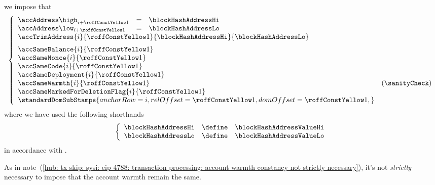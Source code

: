 \item[\underline{\underline{Loading the \inst{BLOCKHASH} system smart contract:}}] 
	we impose that
	\[
		\left\{ \begin{array}{lclr}
			\accAddress  \high _{i + \roffTxSkipSysiBlockHashSystemContractAccount} & = & \blockHashAddressHi \\
			\accAddress  \low  _{i + \roffTxSkipSysiBlockHashSystemContractAccount} & = & \blockHashAddressLo \\
			\multicolumn{4}{l}{
				\accTrimAddress
				{i}{\roffTxSkipSysiBlockHashSystemContractAccount}
				{\blockHashAddressHi}
				{\blockHashAddressLo}} \vspace{2mm} \\
			\multicolumn{3}{l}{\accSameBalance                       {i}{\roffTxSkipSysiBlockHashSystemContractAccount}} \\
			\multicolumn{3}{l}{\accSameNonce                         {i}{\roffTxSkipSysiBlockHashSystemContractAccount}} \\
			\multicolumn{3}{l}{\accSameCode                          {i}{\roffTxSkipSysiBlockHashSystemContractAccount}} \\
			\multicolumn{3}{l}{\accSameDeployment                    {i}{\roffTxSkipSysiBlockHashSystemContractAccount}} \\
			\multicolumn{3}{l}{\accSameWarmth                        {i}{\roffTxSkipSysiBlockHashSystemContractAccount}} & (\sanityCheck) \\
			\multicolumn{3}{l}{\accSameMarkedForDeletionFlag         {i}{\roffTxSkipSysiBlockHashSystemContractAccount}} \\
			\multicolumn{3}{l}{
				\standardDomSubStamps {
					anchorRow = i                                             ,
					relOffset = \roffTxSkipSysiBlockHashSystemContractAccount ,
					domOffset = \roffTxSkipSysiBlockHashSystemContractAccount ,
				}
			} \\
		\end{array} \right.
	\]
	where we have used the following shorthands
	\[
		\left\{ \begin{array}{lcl}
			\blockHashAddressHi & \define & \blockHashAddressValueHi \\
			\blockHashAddressLo & \define & \blockHashAddressValueLo \\
		\end{array} \right.
	\]
	in accordance with \cite{EIP-2935}.

	\saNote{}
	As in note~(\ref{hub: tx skip: sysi: eip 4788: transaction processing: account warmth constancy not strictly necessary}),
	it's not \emph{strictly} necessary to impose that the account warmth remain the same.
